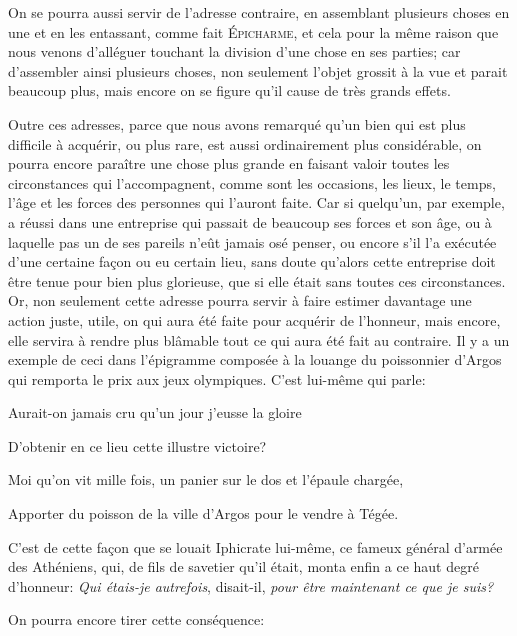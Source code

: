 \bigbreak

On se pourra aussi servir de l'adresse contraire, en assemblant plusieurs choses en une et en les entassant, comme fait
\textsc{Épicharme}, et cela pour la même raison que nous venons d'alléguer touchant la division d'une chose en ses
parties; car d'assembler ainsi plusieurs choses, non seulement l'objet grossit à la vue et parait beaucoup plus, mais
encore on se figure qu'il cause de très grands effets. 

\bigbreak

Outre ces adresses, parce que nous avons remarqué qu'un bien qui est plus difficile à acquérir, ou plus rare, est aussi
ordinairement plus considérable, on pourra encore paraître une chose plus grande en faisant valoir toutes les circonstances
qui l’accompagnent, comme sont les occasions, les lieux, le temps, l'âge et les forces des personnes qui l'auront faite. Car
si quelqu'un, par exemple, a réussi dans une entreprise qui passait de beaucoup ses forces et son âge, ou à laquelle pas un
de ses pareils n'eût jamais osé penser, ou encore s'il l'a exécutée d'une certaine façon ou eu certain lieu, sans doute
qu'alors cette entreprise doit être tenue pour bien plus glorieuse, que si elle était sans toutes ces circonstances. Or, non
seulement cette adresse pourra servir à faire estimer davantage une action juste, utile, on qui aura été faite pour acquérir
de l'honneur, mais encore, elle servira à rendre plus blâmable tout ce qui aura été fait au contraire. Il y a un exemple de
ceci dans l'épigramme composée à la louange du poissonnier d'Argos qui remporta le prix aux jeux olympiques. C'est lui-même
qui parle:

\begin{emphpar}
   Aurait-on jamais cru qu'un jour j'eusse la gloire

   D'obtenir en ce lieu cette illustre victoire?

   Moi qu'on vit mille fois, un panier sur le dos et l'épaule chargée,

   Apporter du poisson de la ville d'Argos pour le vendre à Tégée.
\end{emphpar}

C'est de cette façon que se louait Iphicrate lui-même, ce fameux général d'armée des Athéniens, qui, de fils de savetier
qu'il était, monta enfin a ce haut degré d'honneur: \emph{Qui étais-je autrefois}, disait-il, \emph{pour être maintenant
ce que je suis?}

\bigbreak

On pourra encore tirer cette conséquence:

